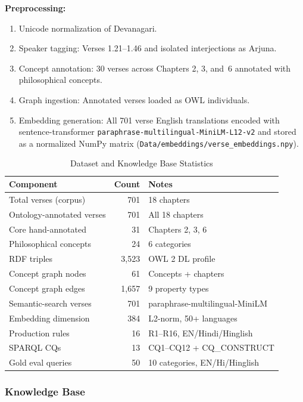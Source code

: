 \documentclass[conference]{IEEEtran}
\begin{document}
\textbf{Preprocessing:}
\begin{enumerate}[leftmargin=*]
  \item Unicode normalization of Devanagari.
  \item Speaker tagging: Verses 1.21--1.46 and isolated interjections as Arjuna.
  \item Concept annotation: 30 verses across Chapters 2, 3, and~6 annotated
        with philosophical concepts.
  \item Graph ingestion: Annotated verses loaded as OWL individuals.
  \item Embedding generation: All 701 verse English translations encoded with
        sentence-transformer \texttt{paraphrase-multilingual-MiniLM-L12-v2} and stored as a normalized NumPy matrix (\texttt{Data/embeddings/verse\_embeddings.npy}).
\end{enumerate}

\begin{table}[!t]
\caption{Dataset and Knowledge Base Statistics}
\label{tab:dataset}
\centering
\small
\begin{tabular}{@{}l r p{3.0cm}@{}}
\toprule
\textbf{Component} & \textbf{Count} & \textbf{Notes} \\
\midrule
Total verses (corpus) & 701 & 18 chapters \\
Ontology-annotated verses & 701 & All 18 chapters \\
\quad Core hand-annotated & 31 & Chapters 2, 3, 6 \\
Philosophical concepts & 24 & 6 categories \\
RDF triples & 3,523 & OWL 2 DL profile \\
Concept graph nodes & 61 & Concepts + chapters \\
Concept graph edges & 1,657 & 9 property types \\
Semantic-search verses & 701 & paraphrase-multilingual-MiniLM \\
Embedding dimension & 384 & L2-norm, 50+ languages \\
Production rules & 16 & R1--R16, EN/Hindi/Hinglish \\
SPARQL CQs & 13 & CQ1--CQ12 + CQ\_CONSTRUCT \\
Gold eval queries & 50 & 10 categories, EN/Hi/Hinglish \\
\bottomrule
\end{tabular}
\end{table}

\subsubsection{Knowledge Base}
\end{document}
